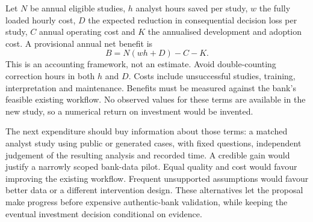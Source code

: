 Let $N$ be annual eligible studies, $h$ analyst hours saved per study, $w$ the
fully loaded hourly cost, $D$ the expected reduction in consequential decision
loss per study, $C$ annual operating cost and $K$ the annualised development
and adoption cost. A provisional annual net benefit is
\[
 B=N(wh+D)-C-K.
\]
This is an accounting framework, not an estimate. Avoid double-counting
correction hours in both $h$ and $D$. Costs include unsuccessful studies,
training, interpretation and maintenance. Benefits must be measured against
the bank's feasible existing workflow. No observed values for these terms
are available in the new study, so a numerical return on investment would
be invented.

The next expenditure should buy information about those terms: a matched
analyst study using public or generated cases, with fixed questions, independent
judgement of the resulting analysis and recorded time. A credible gain would
justify a narrowly scoped bank-data pilot. Equal quality and cost would favour
improving the existing workflow. Frequent unsupported assumptions would favour
better data or a different intervention design. These alternatives let the
proposal make progress before expensive authentic-bank validation, while
keeping the eventual investment decision conditional on evidence.
